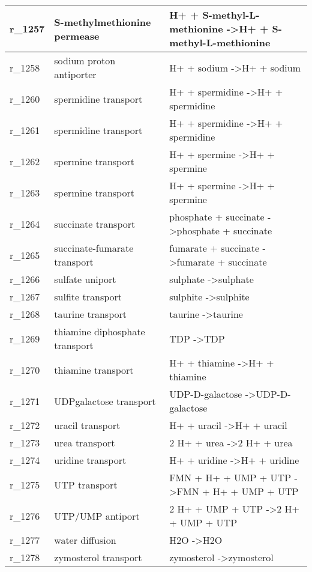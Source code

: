 \begin{landscape}
{\begin{longtable}{|l|p{7cm}|p{15cm}|}
r\_1257 & S-methylmethionine permease & H+ + S-methyl-L-methionine  -\textgreater H+ + S-methyl-L-methionine \\ \hline
r\_1258 & sodium proton antiporter & H+ + sodium  -\textgreater H+ + sodium \\ \hline
r\_1260 & spermidine transport & H+ + spermidine  -\textgreater H+ + spermidine \\ \hline
r\_1261 & spermidine transport & H+ + spermidine  -\textgreater H+ + spermidine \\ \hline
r\_1262 & spermine transport & H+ + spermine  -\textgreater H+ + spermine \\ \hline
r\_1263 & spermine transport & H+ + spermine  -\textgreater H+ + spermine \\ \hline
r\_1264 & succinate transport & phosphate + succinate  -\textgreater phosphate + succinate \\ \hline
r\_1265 & succinate-fumarate transport & fumarate + succinate  -\textgreater fumarate + succinate \\ \hline
r\_1266 & sulfate uniport & sulphate  -\textgreater sulphate \\ \hline
r\_1267 & sulfite transport & sulphite  -\textgreater sulphite \\ \hline
r\_1268 & taurine transport & taurine  -\textgreater taurine \\ \hline
r\_1269 & thiamine diphosphate transport & TDP  -\textgreater TDP \\ \hline
r\_1270 & thiamine transport & H+ + thiamine  -\textgreater H+ + thiamine \\ \hline
r\_1271 & UDPgalactose transport & UDP-D-galactose  -\textgreater UDP-D-galactose \\ \hline
r\_1272 & uracil transport & H+ + uracil  -\textgreater H+ + uracil \\ \hline
r\_1273 & urea transport & 2 H+ + urea  -\textgreater 2 H+ + urea \\ \hline
r\_1274 & uridine transport & H+ + uridine  -\textgreater H+ + uridine \\ \hline
r\_1275 & UTP transport & FMN + H+ + UMP + UTP  -\textgreater FMN + H+ + UMP + UTP \\ \hline
r\_1276 & UTP/UMP antiport & 2 H+ + UMP + UTP  -\textgreater 2 H+ + UMP + UTP \\ \hline
r\_1277 & water diffusion & H2O  -\textgreater H2O \\ \hline
r\_1278 & zymosterol transport & zymosterol  -\textgreater zymosterol \\ \hline

\end{longtable}}
\end{landscape}
